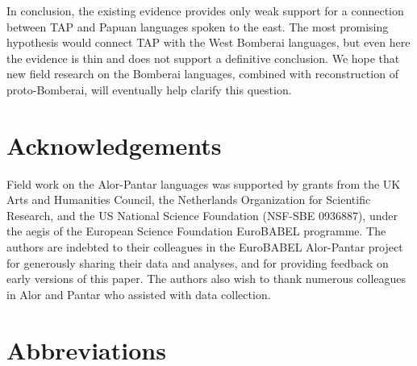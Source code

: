In conclusion, the existing evidence provides only weak support for a connection between TAP and Papuan languages spoken to the east. The most promising hypothesis would connect TAP with the West Bomberai languages, but even here the evidence is thin and does not support a definitive conclusion. We hope that new field research on the Bomberai languages, combined with reconstruction of proto-Bomberai, will eventually help clarify this question.

\section*{Acknowledgements}

Field work on the Alor-Pantar languages was supported by grants from  the UK Arts and Humanities Council, the Netherlands Organization for Scientific Research, and the US National Science Foundation (NSF-SBE 0936887), under the aegis of the European Science Foundation EuroBABEL programme. The authors are indebted to their colleagues in the \mbox{EuroBABEL} Alor-Pantar project for generously sharing their data and analyses, and for providing feedback on early versions of this paper. The authors also wish to thank numerous colleagues in Alor and Pantar who assisted with data collection.

\section*{Abbreviations}


